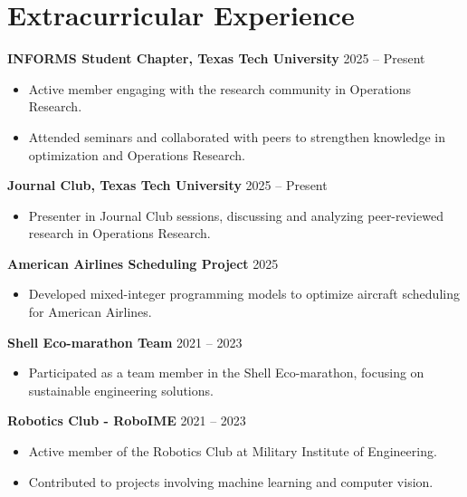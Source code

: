 \documentclass[a4paper,11pt]{article}
\begin{document}
\section{\textbf{Extracurricular Experience}}
\vspace{2mm}

\textbf{INFORMS Student Chapter, Texas Tech University} \hspace*{\fill} 2025 -- Present
\vspace{-1mm}
\begin{itemize}[leftmargin=10pt]
    \item Active member engaging with the research community in Operations Research.
    \vspace{-1mm}
    \item Attended seminars and collaborated with peers to strengthen knowledge in optimization and Operations Research.
\end{itemize}

\pagebreak

\textbf{Journal Club, Texas Tech University} \hspace*{\fill} 2025 -- Present
\vspace{-1mm}
\begin{itemize}[leftmargin=10pt]
    \item Presenter in Journal Club sessions, discussing and analyzing peer-reviewed research in Operations Research.
\end{itemize}

\textbf{American Airlines Scheduling Project} \hspace*{\fill} 2025
\vspace{-1mm}
\begin{itemize}[leftmargin=10pt]
\item Developed mixed-integer programming models to optimize aircraft scheduling for American Airlines.
\end{itemize}

\textbf{Shell Eco-marathon Team} \hspace*{\fill} 2021 -- 2023
\vspace{-1mm}
\begin{itemize}[leftmargin=10pt]
    \item Participated as a team member in the Shell Eco-marathon, focusing on sustainable engineering solutions.
\end{itemize}

\textbf{Robotics Club - RoboIME} \hspace*{\fill} 2021 -- 2023
\vspace{-1mm}
\begin{itemize}[leftmargin=10pt]
    \item Active member of the Robotics Club at Military Institute of Engineering.
    \vspace{-1mm}
    \item Contributed to projects involving machine learning and computer vision.
\end{itemize}
\end{document}

